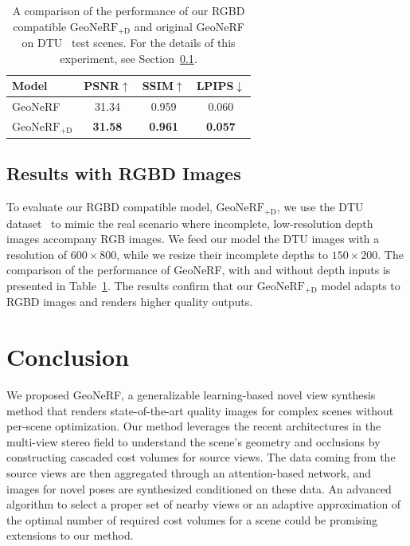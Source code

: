 \begin{table}[t]
\begin{center}
        \begin{tabular}{l|ccc}
        \hline
        Model & \small PSNR$\uparrow$ & \small SSIM$\uparrow$ & \small LPIPS$\downarrow$  \\
        \hline
        GeoNeRF & 31.34 & 0.959 & 0.060  \\
        $\text{GeoNeRF}_{\text{+D}}$  & \textbf{31.58} & \textbf{0.961} & \textbf{0.057} \\
        \hline
        \end{tabular}
    \end{center}
    \caption{A comparison of the performance of our RGBD compatible $\text{GeoNeRF}_{\text{+D}}$ and original GeoNeRF on DTU~\cite{jensen2014large} test scenes. For the details of this experiment, see Section~\ref{sec:c3_rgbd}.}
    \label{table:rgbd}
\end{table}

\subsection{Results with RGBD Images} \label{sec:c3_rgbd}
To evaluate our RGBD compatible model, $\text{GeoNeRF}_{\text{+D}}$, we use the DTU dataset~\cite{jensen2014large} to mimic the real scenario where incomplete, low-resolution depth images accompany RGB images. We feed our model the DTU images with a resolution of $600 \times 800$, while we resize their incomplete depths to $150 \times 200$. The comparison of the performance of GeoNeRF, with and without depth inputs is presented in Table~\ref{table:rgbd}. The results confirm that our $\text{GeoNeRF}_{\text{+D}}$ model adapts to RGBD images and renders higher quality outputs.

\section{Conclusion}
We proposed GeoNeRF, a generalizable learning-based novel view synthesis method that renders state-of-the-art quality images for complex scenes without per-scene optimization. Our method leverages the recent architectures in the multi-view stereo field to understand the scene's geometry and occlusions by constructing cascaded cost volumes for source views. The data coming from the source views are then aggregated through an attention-based network, and images for novel poses are synthesized conditioned on these data. An advanced algorithm to select a proper set of nearby views or an adaptive approximation of the optimal number of required cost volumes for a scene could be promising extensions to our method.

